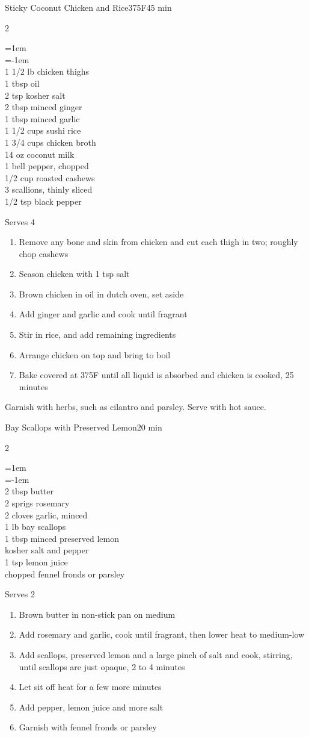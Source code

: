 \documentclass{article}
\newenvironment{recipe}[3][]
    {\begin{cardbase}[#1]{#2}{#3}
    \columnratio{0.333}
    \begin{paracol}{2}}
    {\end{paracol}\end{cardbase}}
\newenvironment{denserecipe}[3][]
    {\small
    \begin{recipe}[#1]{#2}{#3}}
    {\end{recipe}}
\newcommand{\nextcolumn}{\switchcolumn}
\newenvironment{ingredients}
    {
    \begin{obeylines}
    \vspace{\parskip}
    \setlength{\parskip}{0.25em}
    \vspace{-0.25em}
    \leftskip=1em
    \parindent=-1em}
    {\end{obeylines}}
\newenvironment{steps}
    {\begin{enumerate}[leftmargin=*,topsep=0pt]}
    {\end{enumerate}}
\newcommand{\fahrenheit}[1]{#1\textdegree{}F}
\newcommand{\tag}[1]{\hspace{1em}#1}
\newcommand{\symboltag}[2]{\tag{#1\hspace{0.4em}#2}}
\newcommand{\totaltime}[1]{\symboltag{\raisebox{-0.1em}{\small\StopWatchEnd}}{#1}}
\newcommand{\preheat}[1]{\symboltag{\Topbottomheat}{#1}}
\begin{document}
\begin{denserecipe}{Sticky Coconut Chicken and Rice}{\preheat{\fahrenheit{375}}\totaltime{45 min}}
\begin{ingredients}
1 1/2 lb chicken thighs
1 tbsp oil
2 tsp kosher salt
2 tbsp minced ginger
1 tbsp minced garlic
1 1/2 cups sushi rice
1 3/4 cups chicken broth
14 oz coconut milk
1 bell pepper, chopped
1/2 cup roasted cashews
3 scallions, thinly sliced
1/2 tsp black pepper
\end{ingredients}
\nextcolumn
Serves 4
\begin{steps}
    \item Remove any bone and skin from chicken and cut each thigh in two; roughly chop cashews
    \item Season chicken with 1 tsp salt
    \item Brown chicken in oil in dutch oven, set aside
    \item Add ginger and garlic and cook until fragrant
    \item Stir in rice, and add remaining ingredients
    \item Arrange chicken on top and bring to boil
    \item Bake covered at \fahrenheit{375} until all liquid is absorbed and chicken is cooked, 25 minutes
\end{steps}

Garnish with herbs, such as cilantro and parsley. Serve with hot sauce.
\end{denserecipe}

\begin{recipe}{Bay Scallops with Preserved Lemon}{\totaltime{20 min}}
\begin{ingredients}
2 tbsp butter
2 sprigs rosemary
2 cloves garlic, minced
1 lb bay scallops
1 tbsp minced preserved lemon
kosher salt and pepper
1 tsp lemon juice
chopped fennel fronds or parsley
\end{ingredients}
\nextcolumn
Serves 2
\begin{steps}
    \item Brown butter in non-stick pan on medium
    \item Add rosemary and garlic, cook until fragrant, then lower heat to medium-low
    \item Add scallops, preserved lemon and a large pinch of salt and cook, stirring, until scallops are just opaque, 2 to 4 minutes
    \item Let sit off heat for a few more minutes
    \item Add pepper, lemon juice and more salt
    \item Garnish with fennel fronds or parsley
\end{steps}
\end{recipe}
\end{document}
